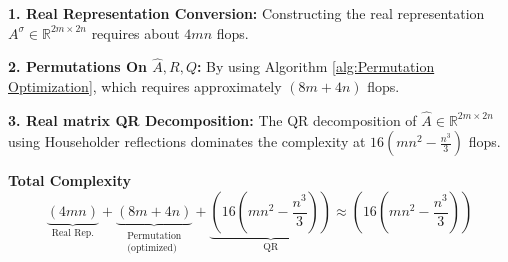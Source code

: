 \documentclass[5p,10pt]{elsarticle}
\numberwithin{equation}{section}
\begin{document}
\textbf{1. Real Representation Conversion:}
Constructing the real representation $A^\sigma \in \mathbb{R}^{2m \times 2n}$ requires about $4mn$ flops. 

\textbf{2. Permutations On $\hat{A}, R, Q$:}
By using Algorithm \ref{alg:Permutation Optimization},  which requires approximately  $(8m+4n)$ flops.


\textbf{3. Real matrix QR Decomposition:}
The QR decomposition of $\hat{A} \in \mathbb{R}^{2m \times 2n}$ using Householder reflections dominates the complexity at $16(mn^2-\frac{n^3}{3})$ flops.

\textbf{Total Complexity}
$$
\underbrace{(4mn)}_{\text{Real Rep.}} + \underbrace{(8m+4n)}_{\substack{\text{Permutation} \\ \text{(optimized)}}} + \underbrace{(16(mn^2-\frac{n^3}{3}))}_{\text{QR}} \approx \boxed{(16(mn^2-\frac{n^3}{3}))}
$$  
\end{document}
